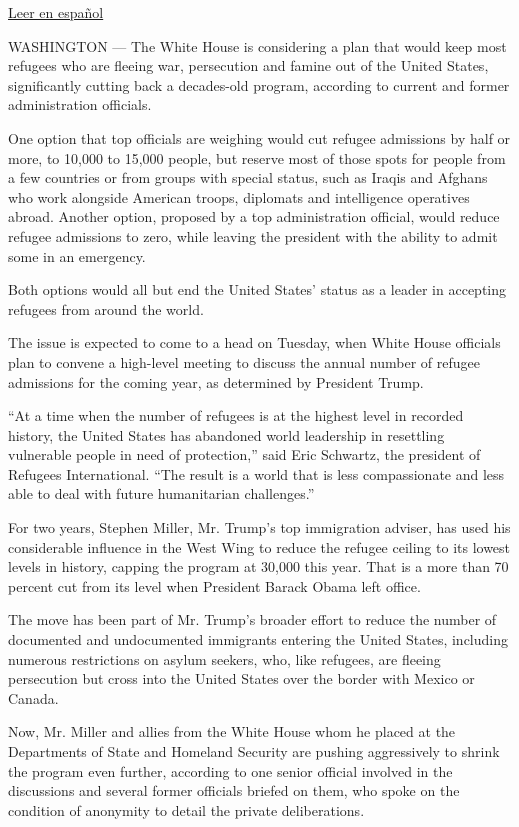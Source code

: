 \href{https://www.nytimes3xbfgragh.onion/es/2019/09/09/espanol/mundo/trump-refugiados-recorte.html}{Leer
en español}

WASHINGTON --- The White House is considering a plan that would keep
most refugees who are fleeing war, persecution and famine out of the
United States, significantly cutting back a decades-old program,
according to current and former administration officials.

One option that top officials are weighing would cut refugee admissions
by half or more, to 10,000 to 15,000 people, but reserve most of those
spots for people from a few countries or from groups with special
status, such as Iraqis and Afghans who work alongside American troops,
diplomats and intelligence operatives abroad. Another option, proposed
by a top administration official, would reduce refugee admissions to
zero, while leaving the president with the ability to admit some in an
emergency.

Both options would all but end the United States' status as a leader in
accepting refugees from around the world.

The issue is expected to come to a head on Tuesday, when White House
officials plan to convene a high-level meeting to discuss the annual
number of refugee admissions for the coming year, as determined by
President Trump.

``At a time when the number of refugees is at the highest level in
recorded history, the United States has abandoned world leadership in
resettling vulnerable people in need of protection,'' said Eric
Schwartz, the president of Refugees International. ``The result is a
world that is less compassionate and less able to deal with future
humanitarian challenges.''

For two years, Stephen Miller, Mr. Trump's top immigration adviser, has
used his considerable influence in the West Wing to reduce the refugee
ceiling to its lowest levels in history, capping the program at 30,000
this year. That is a more than 70 percent cut from its level when
President Barack Obama left office.

The move has been part of Mr. Trump's broader effort to reduce the
number of documented and undocumented immigrants entering the United
States, including numerous restrictions on asylum seekers, who, like
refugees, are fleeing persecution but cross into the United States over
the border with Mexico or Canada.

Now, Mr. Miller and allies from the White House whom he placed at the
Departments of State and Homeland Security are pushing aggressively to
shrink the program even further, according to one senior official
involved in the discussions and several former officials briefed on
them, who spoke on the condition of anonymity to detail the private
deliberations.


